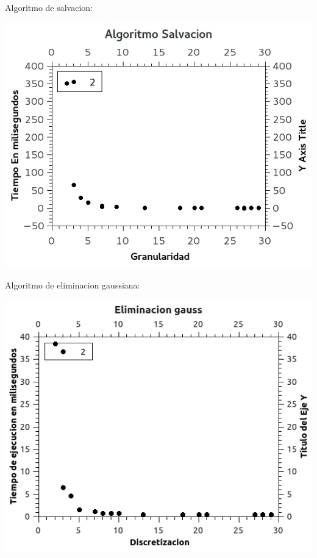 Algoritmo de salvacion:
\begin{center}
 \includegraphics[width=400pt]{graficas/algoritmo salvacion.jpg}
\end{center}

Algoritmo de eliminacion gaussiana:
\begin{center}
 \includegraphics[width=400pt]{graficas/gauss.jpg}
\end{center}

